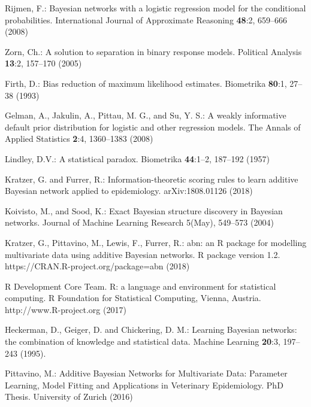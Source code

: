 \begin{thebibliography}{99.}
 Rijmen, F.: Bayesian networks with a logistic regression model for the conditional probabilities. International Journal of Approximate Reasoning \textbf{48}:2, 659--666 (2008)

Zorn, Ch.: A solution to separation in binary response models. Political Analysis \textbf{13}:2, 157--170 (2005)

 Firth, D.: Bias reduction of maximum likelihood estimates. Biometrika \textbf{80}:1, 27--38 (1993)

 Gelman, A., Jakulin, A., Pittau, M. G., and Su, Y. S.: A weakly informative default prior distribution for logistic and other regression models. The Annals of Applied Statistics \textbf{2}:4, 1360--1383 (2008)

Lindley, D.V.: A statistical paradox. Biometrika \textbf{44}:1--2, 187--192 (1957)

Kratzer, G. and Furrer, R.:
    Information-theoretic scoring rules to learn additive Bayesian network applied to epidemiology.
    arXiv:1808.01126 (2018)

Koivisto, M., and Sood, K.: Exact Bayesian structure discovery in Bayesian networks. Journal of Machine Learning Research 5(May), 549--573 (2004)



Kratzer, G., Pittavino, M., Lewis, F., Furrer, R.: abn: an R package for modelling multivariate data using additive Bayesian networks. R package version 1.2. https://CRAN.R-project.org/package=abn (2018)


R Development Core Team. R: a language and environment for statistical computing.
R Foundation for Statistical Computing, Vienna, Austria. http://www.R-project.org (2017)

Heckerman, D., Geiger, D. and Chickering, D. M.: Learning Bayesian networks: the combination of knowledge and statistical data. Machine Learning \textbf{20}:3, 197--243 (1995).

Pittavino, M.: Additive Bayesian Networks for Multivariate Data: Parameter Learning,
Model Fitting and Applications in Veterinary Epidemiology. PhD Thesis. University of Zurich (2016)




\end{thebibliography}
